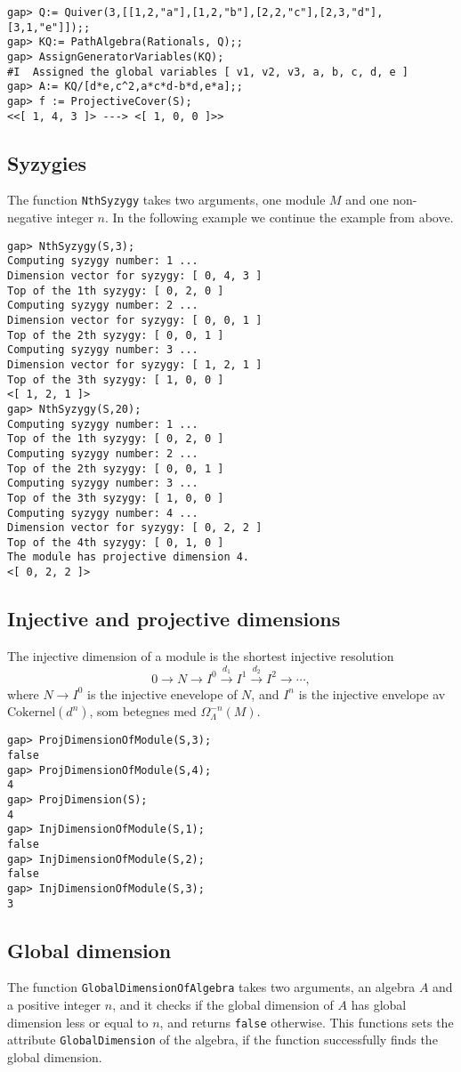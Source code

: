 \documentclass{amsart}
\theoremstyle{definition}
\newcommand{\code}[1]{\texttt{#1}}
\theoremstyle{theoretic}
\begin{document}
\begin{verbatim}
gap> Q:= Quiver(3,[[1,2,"a"],[1,2,"b"],[2,2,"c"],[2,3,"d"],
[3,1,"e"]]);;
gap> KQ:= PathAlgebra(Rationals, Q);;
gap> AssignGeneratorVariables(KQ);
#I  Assigned the global variables [ v1, v2, v3, a, b, c, d, e ]
gap> A:= KQ/[d*e,c^2,a*c*d-b*d,e*a];;
gap> f := ProjectiveCover(S);
<<[ 1, 4, 3 ]> ---> <[ 1, 0, 0 ]>>
\end{verbatim}

\subsection{Syzygies}
The function \code{NthSyzygy} takes two arguments, one module $M$ and
one non-negative integer $n$.  In the following example we continue
the example from above. 
\begin{verbatim}
gap> NthSyzygy(S,3);
Computing syzygy number: 1 ...
Dimension vector for syzygy: [ 0, 4, 3 ]
Top of the 1th syzygy: [ 0, 2, 0 ]
Computing syzygy number: 2 ...
Dimension vector for syzygy: [ 0, 0, 1 ]
Top of the 2th syzygy: [ 0, 0, 1 ]
Computing syzygy number: 3 ...
Dimension vector for syzygy: [ 1, 2, 1 ]
Top of the 3th syzygy: [ 1, 0, 0 ]
<[ 1, 2, 1 ]>
gap> NthSyzygy(S,20);
Computing syzygy number: 1 ...
Top of the 1th syzygy: [ 0, 2, 0 ]
Computing syzygy number: 2 ...
Top of the 2th syzygy: [ 0, 0, 1 ]
Computing syzygy number: 3 ...
Top of the 3th syzygy: [ 1, 0, 0 ]
Computing syzygy number: 4 ...
Dimension vector for syzygy: [ 0, 2, 2 ]
Top of the 4th syzygy: [ 0, 1, 0 ]
The module has projective dimension 4.
<[ 0, 2, 2 ]>
\end{verbatim}

\subsection{Injective and projective dimensions}
The injective dimension of a module is the shortest injective
resolution
\[0\to N\to I^0\xrightarrow{d_1} I^1\xrightarrow{d_2} I^2\to \cdots, \]
where $N\to I^0$ is the injective enevelope of $N$, and $I^{n}$ is the
injective envelope av $\textrm{Cokernel}(d^n)$, som betegnes med
$\Omega^{-n}_\Lambda(M)$. 
\begin{verbatim}
gap> ProjDimensionOfModule(S,3);
false
gap> ProjDimensionOfModule(S,4);
4
gap> ProjDimension(S);
4
gap> InjDimensionOfModule(S,1); 
false
gap> InjDimensionOfModule(S,2);
false
gap> InjDimensionOfModule(S,3);
3
\end{verbatim}


\subsection{Global dimension}
The function \code{GlobalDimensionOfAlgebra} takes two arguments, an
algebra $A$ and a positive integer $n$, and it checks if the global
dimension of $A$ has global dimension less or equal to $n$, and
returns \code{false} otherwise.  This functions sets the attribute
\code{GlobalDimension} of the algebra, if the function successfully
finds the global dimension. 
\end{document}
